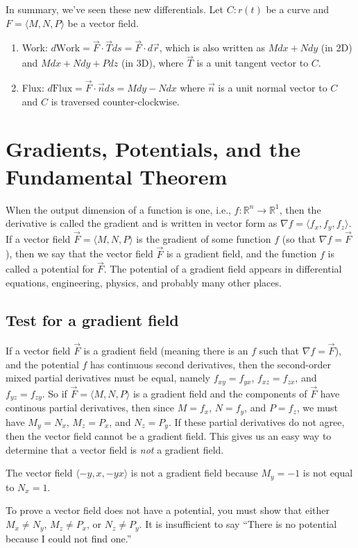 In summary, we've seen these new differentials.    Let $C\colon r(t)$ be a curve and
$F=\langle M,N,P\rangle$ be a vector field.
\begin{enumerate}
\item Work: $d\text{Work} = \vec F\cdot \vec T ds = \vec F\cdot d\vec r$, which is also written as $Mdx+Ndy$ (in 2D) and $Mdx+Ndy+Pdz$ (in 3D), where $\vec T$ is
a unit tangent vector to $C$.
\item Flux: $d\text{Flux} = \vec F\cdot \vec n ds = Mdy-Ndx$ where $\vec
n$ is a unit normal vector to $C$ and $C$ is traversed counter-clockwise.
\end{enumerate}

\section{Gradients, Potentials, and the Fundamental Theorem}

When the output dimension of a function is one, {i.e.,
  $f\colon{\mathbb{R}}^n\to {\mathbb{R}}^1$}, then the derivative is called
the gradient and is written in vector form as {$\nabla f = \langle f_x,f_y,f_z\rangle$}.
If a vector field {$\vec F = \langle M,N,P\rangle$} is the gradient of some
function {$f$} (so that {$\nabla f= \vec F$}), then we say that the vector
field {$\vec F$} is a gradient field, and the function {$f$} is called
a potential for {$\vec F$}. The potential of a gradient field appears
in differential equations, engineering, physics, and probably many
other places.

\subsection{Test for a gradient field}

If a vector field $\vec F$ is a gradient field (meaning there is an
$f$ such that $\nabla f=\vec F$), and the potential $f$ has continuous
second derivatives, then the second-order mixed partial derivatives
must be equal, namely $f_{xy}=f_{yx}$, $f_{xz}=f_{zx}$, and
$f_{yz}=f_{zy}$. So if $\vec F = \langle M,N,P\rangle$ is a gradient field and the
components of $\vec F$ have continous partial derivatives, then since
$M=f_x$, $N=f_y$, and $P=f_z$, we must have $M_y=N_x$, $M_z=P_x$, and
$N_z=P_y$. If these partial derivatives do not agree, then the vector
field cannot be a gradient field.  This gives us an easy way to
determine that a vector field is \emph{not} a gradient field.

\begin{example}
The vector field $\langle-y,x,-yx\rangle$ is not a
  gradient field because {$M_y=-1$} is not equal to {$N_x=1$}.
\end{example}
To prove a vector field does not have a potential, you must show that
either $M_x\neq N_y$, $M_z\neq P_x$, or $N_z\neq P_y$. It is insufficient to
say ``There is no potential because I could not find one.''


